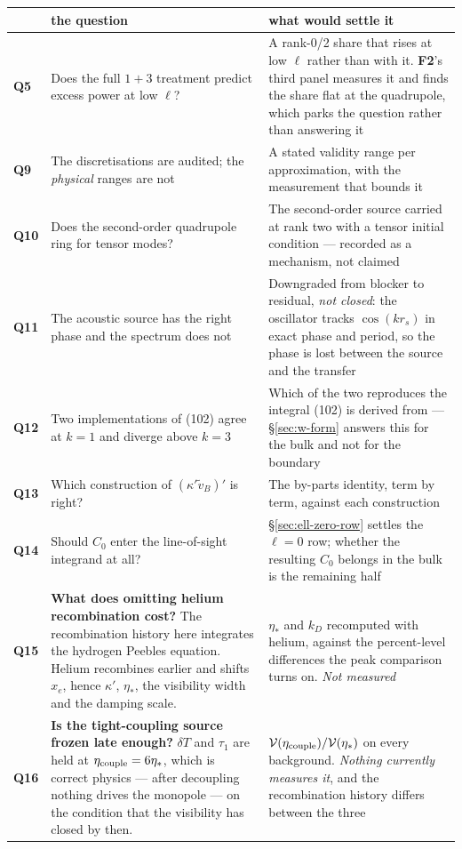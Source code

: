 \begin{center}\small
\begin{tabularx}{\textwidth}{@{}l >{\raggedright\arraybackslash}X >{\raggedright\arraybackslash}X@{}}
\toprule
 & \textbf{the question} & \textbf{what would settle it} \\
\midrule
\textbf{Q5} & Does the full $1+3$ treatment predict excess power at low
  $\ell$? & A rank-0/2 share that rises at low $\ell$ rather than with it.
  \textbf{F2}'s third panel measures it and finds the share flat at the
  quadrupole, which parks the question rather than answering it \\
\textbf{Q9} & The discretisations are audited; the \emph{physical} ranges are
  not & A stated validity range per approximation, with the measurement that
  bounds it \\
\textbf{Q10} & Does the second-order quadrupole ring for tensor modes? & The
  second-order source carried at rank two with a tensor initial condition ---
  recorded as a mechanism, not claimed \\
\textbf{Q11} & The acoustic source has the right phase and the spectrum does
  not & Downgraded from blocker to residual, \emph{not closed}: the oscillator
  tracks $\cos(kr_s)$ in exact phase and period, so the phase is lost between
  the source and the transfer \\
\textbf{Q12} & Two implementations of (102) agree at $k=1$ and diverge above
  $k=3$ & Which of the two reproduces the integral (102) is derived from ---
  \S\ref{sec:w-form} answers this for the bulk and not for the boundary \\
\textbf{Q13} & Which construction of $(\kappa'\tilde v_B)'$ is right? & The
  by-parts identity, term by term, against each construction \\
\textbf{Q14} & Should $C_0$ enter the line-of-sight integrand at all? &
  \S\ref{sec:ell-zero-row} settles the $\ell=0$ row; whether the resulting
  $C_0$ belongs in the bulk is the remaining half \\
\midrule
\textbf{Q15} & \textbf{What does omitting helium recombination cost?} The
  recombination history here integrates the hydrogen Peebles equation. Helium
  recombines earlier and shifts $x_e$, hence $\kappa'$, $\eta_*$, the
  visibility width and the damping scale. & $\eta_*$ and $k_D$ recomputed with
  helium, against the percent-level differences the peak comparison turns on.
  \emph{Not measured} \\
\textbf{Q16} & \textbf{Is the tight-coupling source frozen late enough?}
  $\delta T$ and $\tau_1$ are held at $\eta_{\rm couple}=6\eta_*$, which is
  correct physics --- after decoupling nothing drives the monopole --- on the
  condition that the visibility has closed by then. & $\mathcal V(\eta_{\rm
  couple})/\mathcal V(\eta_*)$ on every background. \emph{Nothing currently
  measures it}, and the recombination history differs between the three \\
\bottomrule
\end{tabularx}
\end{center}


